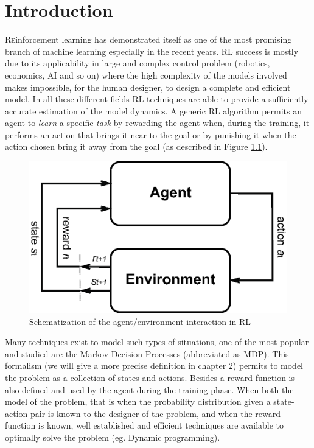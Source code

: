\chapter{Introduction}
  \lettrine[lines=2]{R}einforcement learning has demonstrated itself as one of the most promising
  branch of machine learning especially in the recent years.\newline
  RL success is mostly due to its applicability in large and complex control
  problem (robotics, economics, AI and so on) where the high complexity of the models
  involved makes impossible, for the human designer, to design a complete and
  efficient model.
  In all these different fields RL techniques are able to provide a sufficiently
  accurate estimation of the model dynamics.\newline
  A generic RL algorithm  permits an agent to \textit{learn} a specific
  \textit{task} by rewarding the agent when, during the training, it performs an
  action that brings it near to the goal or by punishing it when the action chosen
  bring it away from the goal (as described in Figure \ref{fig:rl-schema}).\newline

  \begin{figure}
    \centering
    \includegraphics[scale=0.5]{images/rldiagram.eps}
    \caption{Schematization of the agent/environment interaction in RL}
    \label{fig:rl-schema}
  \end{figure}

  \noindent Many techniques exist to model such types of situations, one of the most popular
  and studied are the Markov Decision Processes (abbreviated as MDP). This formalism
  (we will give a more precise definition in chapter 2) permits to model the
  problem as a collection of states and actions. Besides a reward function is
  also defined and used by the agent during the training phase.\newline
  When both the model of the problem, that is when the probability distribution
  given a state-action pair is known to the designer of the problem, and when
  the reward function is known, well established and efficient techniques
  are available to optimally solve the problem (eg. Dynamic programming).\newline

